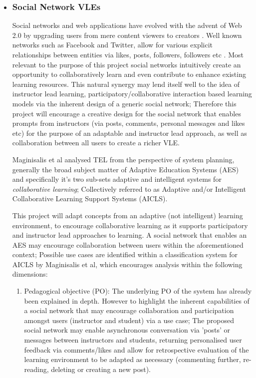     \begin{itemize}[\null]
    \item \subsubsection{Social Network VLEs}
    
    Social networks and web applications have evolved with the advent of Web 2.0 by upgrading users from mere content viewers to creators \cite{Lopez-Vargas2015}. Well known networks such as Facebook and Twitter, allow for various explicit relationships between entities via likes, posts, followers, followers etc \cite{Lopez-Vargas2015}. Most relevant to the purpose of this project social networks intuitively create an opportunity to collaboratively learn and even contribute to enhance existing learning resources\cite{Lopez-Vargas2015,Magnisalis2011}. This natural synergy may lend itself well to the idea of instructor lead learning, participatory/collaborative interaction based learning models via the inherent design of a generic social network; Therefore this project will encourage a creative design for the social network that enables prompts from instructors (via posts, comments, personal messages and likes etc) for the purpose of an adaptable and instructor lead approach, as well as collaboration between all users to create a richer VLE.
    
    Maginisalis et al \cite{Magnisalis2011} analysed TEL from the perspective of system planning, generally the broad subject matter of  Adaptive Education Systems (AES) and specifically it's two sub-sets adaptive and intelligent systems   for \textit{collaborative learning}; Collectively referred to as Adaptive and/or Intelligent Collaborative Learning Support Systems (AICLS).
    
    This project will adapt concepts from an adaptive (not intelligent) learning environment, to encourage collaborative learning as it supports participatory and instructor lead approaches to learning. A social network that enables an AES may encourage  collaboration between users within the aforementioned context; Possible use cases are identified within a classification system for AICLS  by Maginisalis et al, which encourages analysis within the following dimensions\cite{Magnisalis2011}:
    
    \begin{enumerate}
        \item Pedagogical objective (PO): The underlying PO of the system has already been explained in depth. However to highlight the inherent capabilities of a social network that may encourage collaboration and participation amongst users (instructor and student) via a use case; The proposed social network may enable  asynchronous conversation via 'posts' or messages between instructors and students, returning personalised user feedback via comments/likes and allow for retrospective evaluation of the learning environment to be adapted as necessary (commenting further, re-reading, deleting or creating a new post).
        

\end{enumerate}
\end{itemize}
